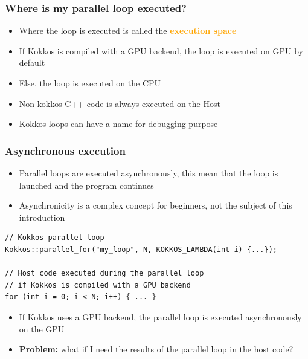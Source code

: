 \documentclass[aspectratio=169]{beamer}
\begin{document}

\begin{frame}[fragile]
    \frametitle{Where is my parallel loop executed?}

\begin{itemize}
    \item Where the loop is executed is called the \textcolor{orange}{\textbf{execution space}}
    \item If Kokkos is compiled with a GPU backend, the loop is executed on GPU by default
    \item Else, the loop is executed on the CPU
    \item Non-kokkos C++ code is always executed on the Host
    \item Kokkos loops can have a name for debugging purpose
\end{itemize}

\end{frame}


\begin{frame}[fragile]
    \frametitle{Asynchronous execution} 

\begin{itemize}
    \item Parallel loops are executed asynchronously, this mean that the loop is launched and the program continues
    \item Asynchronicity is a complex concept for beginners, not the subject of this introduction
\end{itemize}

\small
\begin{verbatim}
// Kokkos parallel loop
Kokkos::parallel_for("my_loop", N, KOKKOS_LAMBDA(int i) {...});

// Host code executed during the parallel loop 
// if Kokkos is compiled with a GPU backend
for (int i = 0; i < N; i++) { ... }
\end{verbatim}

\normalsize


\begin{itemize}
    \item If Kokkos uses a GPU backend, the parallel loop is executed asynchronously on the GPU
    \item \textbf{Problem:} what if I need the results of the parallel loop in the host code?
\end{itemize}

\end{frame}
\end{document}
